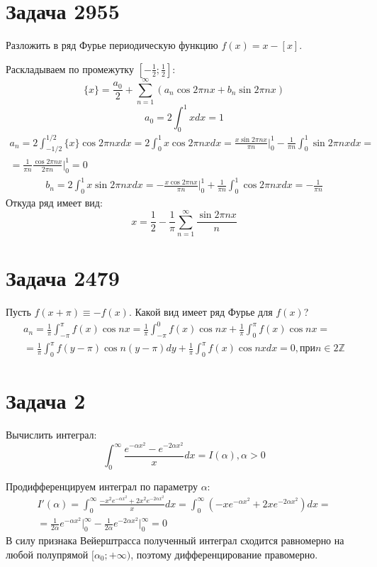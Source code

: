 \documentclass[11pt]{article}
\begin{document}
\section{Задача 2955}
\label{sec:org9d2e4f8}
Разложить в ряд Фурье периодическую функцию \(f(x) = x - [x]\).

Раскладываем по промежутку \(\left[-\frac{1}2; \frac{1}2\right]\):
$$\{x\} = \frac{a_0}2 + \sum_{n = 1}^\infty(a_n\cos 2\pi nx + b_n\sin 2\pi nx)$$
$$a_0 = 2\int_0^1xdx = 1$$
\begin{multline*}
a_n = 2\int_{-1/2}^{1/2}\{x\}\cos 2\pi nxdx = 2\int_0^1x\cos 2\pi nxdx = \frac{x\sin 2\pi nx}{\pi n}\bigg|_0^1 - \frac{1}{\pi n}\int_0^1\sin 2\pi nxdx = \\
= \frac{1}{\pi n}\frac{\cos 2\pi nx}{2\pi n}\bigg|_0^1 = 0
\end{multline*}
\begin{multline*}
b_n = 2\int_0^1x\sin 2\pi nx dx = -\frac{x\cos 2\pi nx}{\pi n}\bigg|_0^1 + \frac{1}{\pi n}\int_0^1\cos 2\pi nxdx = -\frac{1}{\pi n}
\end{multline*}
Откуда ряд имеет вид:
$${x} = \frac{1}2 - \frac{1}\pi\sum_{n = 1}^\infty\frac{\sin 2\pi nx}n$$
\section{Задача 2479}
\label{sec:orgad28a17}
Пусть \(f(x + \pi) \equiv -f(x)\). Какой вид имеет ряд Фурье для \(f(x)\)?
\begin{multline*}
a_n = \frac{1}\pi\int_{-\pi}^\pi f(x)\cos nx = \frac{1}\pi\int_{-\pi}^0f(x)\cos nx + \frac{1}\pi\int_0^\pi f(x)\cos nx = \\
= \frac{1}\pi\int_0^\pi f(y - \pi)\cos n(y - \pi)dy + \frac{1}\pi\int_0^\pi f(x)\cos nxdx = 0, при n \in 2\mathbb{Z}
\end{multline*}
\section{Задача 2}
\label{sec:org74889f6}
Вычислить интеграл:
$$\int_0^\infty\frac{e^{-\alpha x^2} - e^{-2\alpha x^2}}xdx = I(\alpha), \alpha > 0$$

Продифференцируем интеграл по параметру \(\alpha\):
\begin{multline*}
I'(\alpha) = \int_0^\infty\frac{-x^2e^{-\alpha x^2} + 2x^2e^{-2\alpha x^2}}xdx =
\int_0^\infty(-xe^{-\alpha x^2} + 2xe^{-2\alpha x^2})dx = \\
= \frac1{2\alpha}e^{-\alpha x^2}\bigg|_0^\infty - \frac1{2\alpha}{e^{-2\alpha x^2}\bigg|_0^\infty} = 0
\end{multline*}
В силу признака Вейерштрасса полученный интеграл сходится равномерно на любой полупрямой
\([\alpha_0; +\infty)\), поэтому дифференцирование правомерно.
\end{document}
